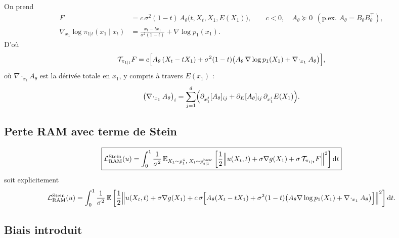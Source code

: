 \documentclass[11pt]{article}
\newcommand{\E}{\mathbb{E}}
\newcommand{\dd}{\mathrm{d}}
\newcommand{\ubar}{\bar u}
\newcommand{\pbase}{p^{\mathrm{base}}}
\newcommand{\divg}{\nabla\!\cdot}
\begin{document}
On prend
\begin{align}
F &= c\, \sigma^2 (1-t)\, A_\theta\bigl(t, X_t, X_1, E(X_1)\bigr),
\qquad c < 0,\quad A_\theta \succeq 0 \ \ (\text{p.ex. } A_\theta = B_\theta B_\theta^\top), \\
\nabla_{x_1} \log \pi_{1|t}(x_1 \mid x_t)
&= \frac{x_t - t x_1}{\sigma^2 (1-t)} + \nabla \log p_1(x_1) .
\end{align}
D'où
\begin{equation}
\mathcal{T}_{\pi_{1|t}} F
= c\Bigl[ A_\theta\,(X_t - t X_1)
+ \sigma^2 (1-t) \bigl( A_\theta\, \nabla \log p_1(X_1) + \divg_{x_1} A_\theta \bigr) \Bigr],
\end{equation}
où $\divg_{x_1} A_\theta$ est la dérivée totale en $x_1$, y compris à travers $E(x_1)$ :
\begin{equation}
\bigl(\divg_{x_1} A_\theta\bigr)_i
= \sum_{j=1}^d \Bigl( \partial_{x_1^j} [A_\theta]_{ij} + \partial_{E}[A_\theta]_{ij}\, \partial_{x_1^j} E(X_1) \Bigr).
\end{equation}

\subsection{Perte RAM avec terme de Stein}

\begin{equation}
\boxed{
\mathcal{L}_{\mathrm{RAM}}^{\mathrm{Stein}}(u)
= \int_0^1 \frac{1}{\sigma^2}\,
\E_{X_1 \sim p_1^{\ubar},\; X_t \sim \pbase_{t|1}}
\left[ \frac{1}{2} \Bigl\| u(X_t,t) + \sigma \nabla g(X_1) + \sigma\, \mathcal{T}_{\pi_{1|t}} F \Bigr\|^2 \right] \dd t
}
\end{equation}
soit explicitement
\begin{equation}
\mathcal{L}_{\mathrm{RAM}}^{\mathrm{Stein}}(u)
= \int_0^1 \frac{1}{\sigma^2}\,
\E \left[ \frac{1}{2} \Bigl\| u(X_t,t) + \sigma \nabla g(X_1)
+ c\,\sigma \Bigl[ A_\theta (X_t - t X_1) + \sigma^2(1-t)\bigl( A_\theta \nabla \log p_1(X_1) + \divg_{x_1} A_\theta \bigr) \Bigr] \Bigr\|^2 \right] \dd t .
\end{equation}

\subsection{Biais introduit}
\end{document}
